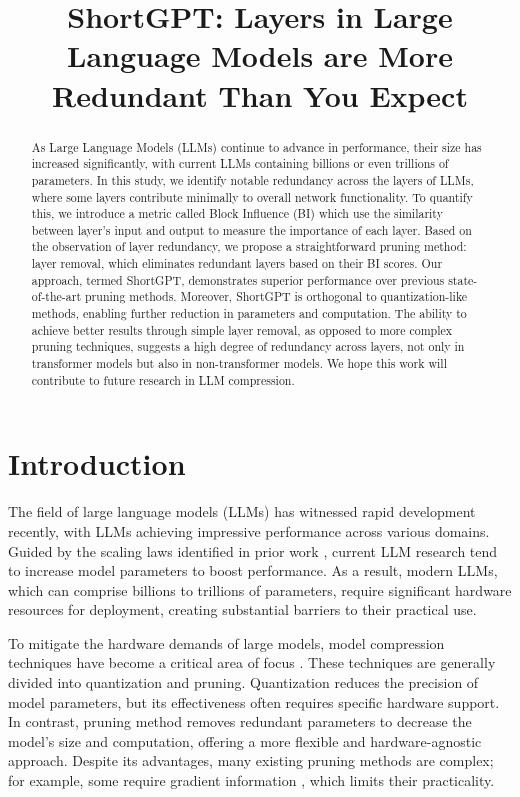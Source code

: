 \title{ShortGPT: Layers in Large Language Models are More Redundant Than You Expect}



\maketitle
	\begin{abstract} \label{lab:abstract}
		As Large Language Models (LLMs) continue to advance in performance, their size has increased significantly, with current LLMs containing billions or even trillions of parameters.  In this study, we identify notable redundancy across the layers of LLMs, where some layers contribute minimally to overall network functionality. To quantify this, we introduce a metric called Block Influence (BI) which use the similarity between layer's input and output to measure the importance of each layer. Based on the observation of layer redundancy, we propose a straightforward pruning method: layer removal, which eliminates redundant layers based on their BI scores. Our approach, termed ShortGPT, demonstrates superior performance over previous state-of-the-art pruning methods.  Moreover, ShortGPT is orthogonal to quantization-like methods, enabling further reduction in parameters and computation. The ability to achieve better results through simple layer removal, as opposed to more complex pruning techniques, suggests a high degree of redundancy across layers, not only in transformer models but also in non-transformer models. We hope this work will contribute to future research in LLM compression.
	\end{abstract}
	\section{Introduction}\label{lab:intro}
	The field of large language models (LLMs) has witnessed rapid development recently, with LLMs achieving impressive performance across various domains. Guided by the scaling laws identified in prior work \citep{kaplan2020scaling,hoffmann2022training}, current LLM research tend to increase model parameters to boost performance. As a result, modern LLMs, which can comprise billions to trillions of parameters, require significant hardware resources for deployment, creating substantial barriers to their practical use.       
	
	To mitigate the hardware demands of large models, model compression techniques have become a critical area of focus \citep{zhu2023survey}. These techniques are generally divided into quantization \citep{liu2021post,gholami2022survey,dettmers2022llm,dettmers2024qlora} and pruning\citep{lecun1989optimal,han2015learning,frantar2023massive}. Quantization reduces the precision of model parameters, but its effectiveness often requires specific hardware support. In contrast, pruning method removes redundant parameters to decrease the model's size and computation, offering a more flexible and hardware-agnostic approach. Despite its advantages, many existing pruning methods are  complex; for example, some require gradient information \citep{ma2024llm}, which limits their practicality.
	
